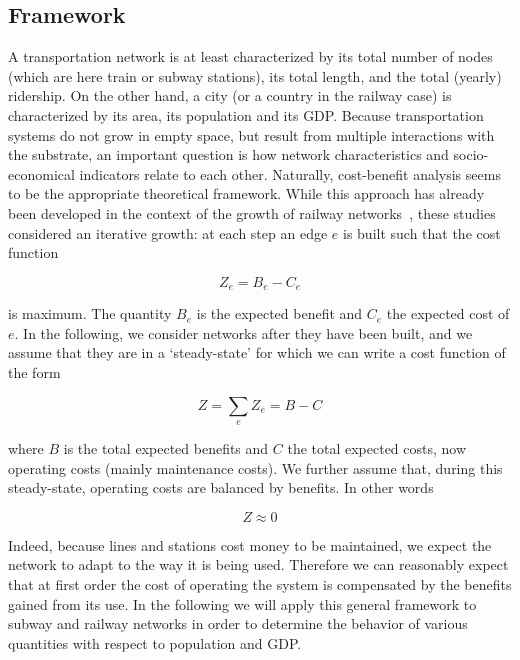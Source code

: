 \subsection*{Framework}

A transportation network is at least characterized by its total number of nodes
(which are here train or subway stations), its total length, and the total
(yearly) ridership. On the other hand, a city (or a country in the railway case)
is characterized by its area, its population and its GDP. Because transportation
systems do not grow in empty space, but result from multiple interactions with
the substrate, an important question is how network characteristics and
socio-economical indicators relate to each other. Naturally, cost-benefit
analysis seems to be the appropriate theoretical framework. While this approach
has already been developed in the context of the growth of railway
networks~\cite{Black:1971,Louf:2013}, these studies considered an iterative
growth: at each step an edge $e$ is built such that the cost function

\begin{equation} Z_e = B_e - C_e \end{equation}

is maximum. The quantity $B_e$ is the expected benefit and $C_e$ the expected
cost of $e$. In the following, we consider networks after they have been built,
and we assume that they are in a `steady-state' for which we can write a cost
function of the form

\begin{equation} Z =\sum_eZ_e= B - C \end{equation}

where $B$ is the total expected benefits and $C$ the total expected costs, now
operating costs (mainly maintenance costs). We further assume that, during this
steady-state, operating costs are balanced by benefits. In other words


\begin{equation} 
    Z \approx 0 
\end{equation} 

Indeed, because lines and stations cost money to be maintained, we expect the
network to adapt to the way it is being used. Therefore we can reasonably expect
that at first order the cost of operating the system is compensated by the
benefits gained from its use.  In the following we will apply this general
framework to subway and railway networks in order to determine the behavior of
various quantities with respect to population and GDP.

